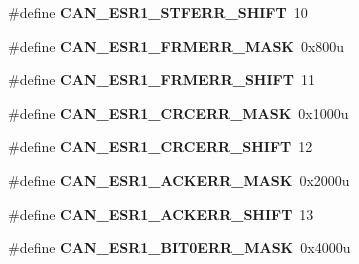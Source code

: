 \begin{DoxyCompactItemize}
\item 
\hypertarget{group___c_a_n___register___masks_ga5f22b1b4cc45dbd63a5adb638b7c61a2}{}\#define {\bfseries C\+A\+N\+\_\+\+E\+S\+R1\+\_\+\+S\+T\+F\+E\+R\+R\+\_\+\+S\+H\+I\+F\+T}~10\label{group___c_a_n___register___masks_ga5f22b1b4cc45dbd63a5adb638b7c61a2}

\item 
\hypertarget{group___c_a_n___register___masks_ga85fea1af50a657cc862d71d166949cbd}{}\#define {\bfseries C\+A\+N\+\_\+\+E\+S\+R1\+\_\+\+F\+R\+M\+E\+R\+R\+\_\+\+M\+A\+S\+K}~0x800u\label{group___c_a_n___register___masks_ga85fea1af50a657cc862d71d166949cbd}

\item 
\hypertarget{group___c_a_n___register___masks_ga0efc518d9eecfd7ed1eaefac3fd8ec23}{}\#define {\bfseries C\+A\+N\+\_\+\+E\+S\+R1\+\_\+\+F\+R\+M\+E\+R\+R\+\_\+\+S\+H\+I\+F\+T}~11\label{group___c_a_n___register___masks_ga0efc518d9eecfd7ed1eaefac3fd8ec23}

\item 
\hypertarget{group___c_a_n___register___masks_gaaafa0a40c19015f5bc060267b18f2433}{}\#define {\bfseries C\+A\+N\+\_\+\+E\+S\+R1\+\_\+\+C\+R\+C\+E\+R\+R\+\_\+\+M\+A\+S\+K}~0x1000u\label{group___c_a_n___register___masks_gaaafa0a40c19015f5bc060267b18f2433}

\item 
\hypertarget{group___c_a_n___register___masks_ga1df87f92bcad133cc7c2677958c95ce4}{}\#define {\bfseries C\+A\+N\+\_\+\+E\+S\+R1\+\_\+\+C\+R\+C\+E\+R\+R\+\_\+\+S\+H\+I\+F\+T}~12\label{group___c_a_n___register___masks_ga1df87f92bcad133cc7c2677958c95ce4}

\item 
\hypertarget{group___c_a_n___register___masks_ga10e077761a90dda3310ffc53a98569a7}{}\#define {\bfseries C\+A\+N\+\_\+\+E\+S\+R1\+\_\+\+A\+C\+K\+E\+R\+R\+\_\+\+M\+A\+S\+K}~0x2000u\label{group___c_a_n___register___masks_ga10e077761a90dda3310ffc53a98569a7}

\item 
\hypertarget{group___c_a_n___register___masks_gabe4b1042038801b2ec9d302339d6869b}{}\#define {\bfseries C\+A\+N\+\_\+\+E\+S\+R1\+\_\+\+A\+C\+K\+E\+R\+R\+\_\+\+S\+H\+I\+F\+T}~13\label{group___c_a_n___register___masks_gabe4b1042038801b2ec9d302339d6869b}

\item 
\hypertarget{group___c_a_n___register___masks_gadd6b78abb7a9321af68208f318c7c116}{}\#define {\bfseries C\+A\+N\+\_\+\+E\+S\+R1\+\_\+\+B\+I\+T0\+E\+R\+R\+\_\+\+M\+A\+S\+K}~0x4000u\label{group___c_a_n___register___masks_gadd6b78abb7a9321af68208f318c7c116}


\end{DoxyCompactItemize}
